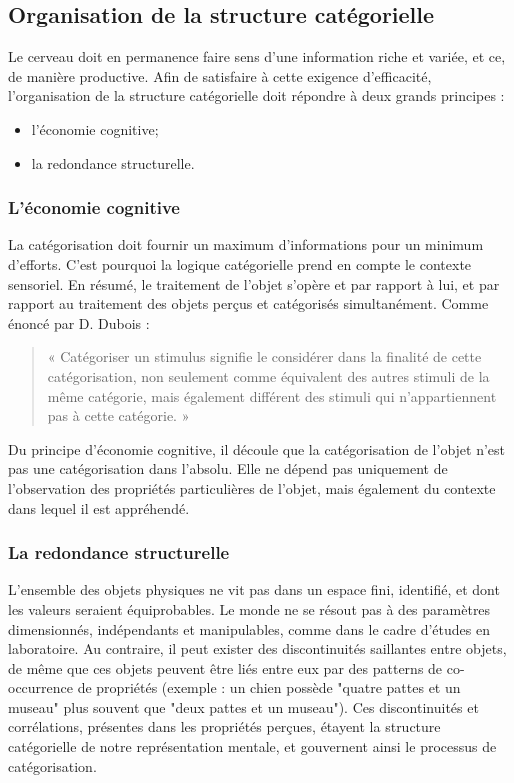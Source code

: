 \subsection{Organisation de la structure catégorielle}

Le cerveau doit en permanence faire sens d'une information riche et variée, et ce, de manière productive. Afin de satisfaire à cette exigence d'efficacité, l'organisation de la structure catégorielle doit répondre à deux grands principes \citep[p. 29]{rosch1978cognition}:

\begin{itemize}
\item l'économie cognitive;
\item la redondance structurelle.
\end{itemize}

\subsubsection{L'économie cognitive}

La catégorisation doit fournir un maximum d'informations pour un minimum d'efforts. C'est pourquoi la logique catégorielle prend en compte le contexte sensoriel. En résumé, le traitement de l'objet s'opère et par rapport à lui, et par rapport au traitement des objets perçus et catégorisés simultanément. Comme énoncé par D. Dubois \citep[p. 33]{dubois1991semantique}:

\begin{quote}
« Catégoriser un stimulus signifie le considérer dans la finalité de cette catégorisation, non seulement comme équivalent des autres stimuli de la même catégorie, mais également différent des stimuli qui n'appartiennent pas à cette catégorie. »
\end{quote}

Du principe d'économie cognitive, il découle que la catégorisation de l'objet n'est pas une catégorisation dans l'absolu. Elle ne dépend pas uniquement de l'observation des propriétés particulières de l'objet, mais également du contexte dans lequel il est appréhendé.

\subsubsection{La redondance structurelle}

L'ensemble des objets physiques ne vit pas dans un espace fini, identifié, et dont les valeurs seraient équiprobables. Le monde ne se résout pas à des paramètres dimensionnés, indépendants et manipulables, comme dans le cadre d'études en laboratoire. Au contraire, il peut exister des discontinuités saillantes entre objets, de même que ces objets peuvent être liés entre eux par des patterns de co-occurrence de propriétés (exemple : un chien possède "quatre pattes et un museau" plus souvent que "deux pattes et un museau"). Ces discontinuités et corrélations, présentes dans les propriétés perçues, étayent la structure catégorielle de notre représentation mentale, et gouvernent ainsi le processus de catégorisation.
 

